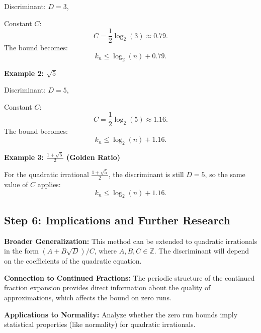 Discriminant: \(D = 3\),

Constant \(C\):
\[
C = \frac{1}{2}\log_2(3) \approx 0.79.
\]
The bound becomes:
\[
k_n \leq \log_2(n) + 0.79.
\]

\textbf{Example 2: \(\sqrt{5}\)}

Discriminant: \(D = 5\),

Constant \(C\):
\[
C = \frac{1}{2}\log_2(5) \approx 1.16.
\]
The bound becomes:
\[
k_n \leq \log_2(n) + 1.16.
\]

\textbf{Example 3: \(\frac{1 + \sqrt{5}}{2}\) (Golden Ratio)}

For the quadratic irrational \(\frac{1 + \sqrt{5}}{2}\), the discriminant is still \(D = 5\), so the same value of \(C\) applies:
\[
k_n \leq \log_2(n) + 1.16.
\]

\subsection*{Step 6: Implications and Further Research}

\textbf{Broader Generalization:} This method can be extended to quadratic irrationals in the form \((A + B\sqrt{D})/C\), where \(A, B, C \in \mathbb{Z}\). The discriminant will depend on the coefficients of the quadratic equation.

\textbf{Connection to Continued Fractions:} The periodic structure of the continued fraction expansion provides direct information about the quality of approximations, which affects the bound on zero runs.

\textbf{Applications to Normality:} Analyze whether the zero run bounds imply statistical properties (like normality) for quadratic irrationals.